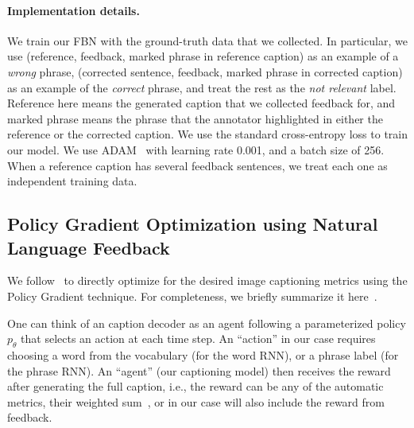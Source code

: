 \paragraph{Implementation details.} We train our FBN with the ground-truth data that we collected. In particular, we use (reference, feedback, marked phrase in reference caption) as an example of a \emph{wrong} phrase, (corrected sentence, feedback, marked phrase in corrected caption) as an example of the \emph{correct} phrase, and treat the rest as the \emph{not relevant} label. Reference here means the generated caption that we collected feedback for, and marked phrase means the phrase that the annotator highlighted in either the reference or the corrected caption. We use the standard cross-entropy loss to train our model. We use ADAM~\cite{kingma2014adam} with learning rate 0.001, and a batch size of 256. When a reference caption has several feedback sentences, we treat each one as independent training data. %


\subsection{Policy Gradient Optimization using Natural Language Feedback}
\label{sec:policy}

We follow~\cite{Selfcritical,Mixer} to directly optimize for the desired image captioning metrics using the Policy Gradient technique. For completeness,  we briefly summarize it here~\cite{Selfcritical}. 

One can think of an caption decoder as an agent following a parameterized policy $p_\theta$ that selects an action at each time step. An ``action'' in our case requires choosing a word from the vocabulary (for the word RNN), or a phrase label (for the phrase RNN). An ``agent'' (our captioning model) then receives the reward after generating the full caption, i.e., the reward can be any of the automatic metrics, their weighted sum~\cite{Selfcritical,Spider}, or in our case will also include the reward from feedback. 


